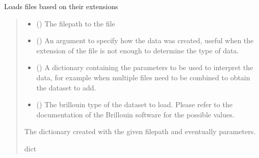 \documentclass[letterpaper,10pt,english]{sphinxmanual}
\begin{document}

\begin{fulllineitems}
\label{\detokenize{source/HDF5_BLS:HDF5_BLS.load_data.load_general}}
\pysigstartsignatures
\pysiglinewithargsret
{}
{\sphinxparamcomma {}\sphinxparamcomma {}\sphinxparamcomma {}}
{}
\pysigstopsignatures
\sphinxAtStartPar
Loads files based on their extensions
\begin{quote}\begin{description}
\begin{itemize}
\item {} 
\sphinxAtStartPar
{} () \textendash{} The filepath to the file

\item {} 
\sphinxAtStartPar
{} () \textendash{} An argument to specify how the data was created, useful when the extension of the file is not enough to determine the type of data.

\item {} 
\sphinxAtStartPar
{} () \textendash{} A dictionary containing the parameters to be used to interpret the data, for example when multiple files need to be combined to obtain the dataset to add.

\item {} 
\sphinxAtStartPar
{} () \textendash{} The brillouin type of the dataset to load. Please refer to the documentation of the Brillouin software for the possible values.

\end{itemize}

\sphinxAtStartPar
The dictionary created with the given filepath and eventually parameters.

\sphinxAtStartPar
dict

\end{description}\end{quote}

\end{fulllineitems}
\end{document}
